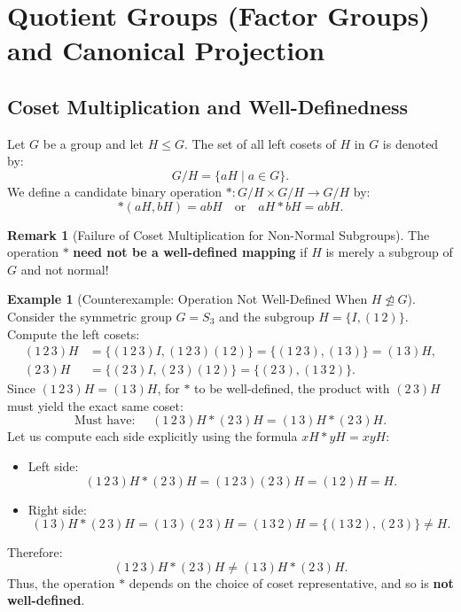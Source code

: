 \documentclass[12pt]{article}
\theoremstyle{definition}
\newtheorem{example}[definition]{Example}
\newtheorem*{remark}{Remark}
\theoremstyle{plain}
\begin{document}
\newpage
\section{Quotient Groups (Factor Groups) and Canonical Projection}

\subsection{Coset Multiplication and Well-Definedness}

Let $G$ be a group and let $H \le G$.
The set of all left cosets of $H$ in $G$ is denoted by:
\[
G/H = \{ aH \mid a \in G \}.
\]
We define a candidate binary operation $*: G/H \times G/H \to G/H$ by:
\[
*(aH, bH) = abH \quad \text{or} \quad aH * bH = abH.
\]

\begin{remark}[Failure of Coset Multiplication for Non-Normal Subgroups]
The operation $*$ \textbf{need not be a well-defined mapping} if $H$ is merely a subgroup of $G$ and not normal!
\end{remark}

\begin{example}[Counterexample: Operation Not Well-Defined When $H \not\trianglelefteq G$]
Consider the symmetric group $G = S_3$ and the subgroup $H = \{ I, (1\,2) \}$.
Compute the left cosets:
\begin{align*}
(1\,2\,3)H &= \{ (1\,2\,3)I, (1\,2\,3)(1\,2) \} = \{ (1\,2\,3), (1\,3) \} = (1\,3)H, \\
(2\,3)H &= \{ (2\,3)I, (2\,3)(1\,2) \} = \{ (2\,3), (1\,3\,2) \}.
\end{align*}
Since $(1\,2\,3)H = (1\,3)H$, for $*$ to be well-defined, the product with $(2\,3)H$ must yield the exact same coset:
\[
\text{Must have: } \quad (1\,2\,3)H * (2\,3)H = (1\,3)H * (2\,3)H.
\]
Let us compute each side explicitly using the formula $xH * yH = xyH$:
\begin{itemize}
    \item Left side:
    \[
    (1\,2\,3)H * (2\,3)H = (1\,2\,3)(2\,3)H = (1\,2)H = H.
    \]
    \item Right side:
    \[
    (1\,3)H * (2\,3)H = (1\,3)(2\,3)H = (1\,3\,2)H = \{ (1\,3\,2), (2\,3) \} \neq H.
    \]
\end{itemize}
Therefore:
\[
(1\,2\,3)H * (2\,3)H \neq (1\,3)H * (2\,3)H.
\]
Thus, the operation $*$ depends on the choice of coset representative, and so is \textbf{not well-defined}.
\end{example}
\end{document}
